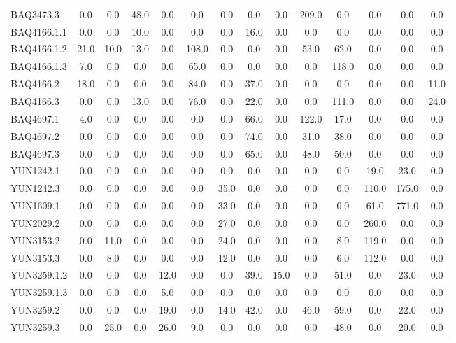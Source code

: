 \documentclass[10pt,a4paper]{article}
\begin{document}
\begin{table}[h]
{\begin{tabular}{|l|*{13}{c|}}
        BAQ3473.3 & 0.0 & 0.0 & 48.0 & 0.0 & 0.0 & 0.0 & 0.0 & 0.0 & 209.0 & 0.0 & 0.0 & 0.0 & 0.0 \\
        BAQ4166.1.1 & 0.0 & 0.0 & 10.0 & 0.0 & 0.0 & 0.0 & 16.0 & 0.0 & 0.0 & 0.0 & 0.0 & 0.0 & 0.0 \\
        BAQ4166.1.2 & 21.0 & 10.0 & 13.0 & 0.0 & 108.0 & 0.0 & 0.0 & 0.0 & 53.0 & 62.0 & 0.0 & 0.0 & 0.0 \\
        BAQ4166.1.3 & 7.0 & 0.0 & 0.0 & 0.0 & 65.0 & 0.0 & 0.0 & 0.0 & 0.0 & 118.0 & 0.0 & 0.0 & 0.0 \\
        BAQ4166.2 & 18.0 & 0.0 & 0.0 & 0.0 & 84.0 & 0.0 & 37.0 & 0.0 & 0.0 & 0.0 & 0.0 & 0.0 & 11.0 \\
        BAQ4166.3 & 0.0 & 0.0 & 13.0 & 0.0 & 76.0 & 0.0 & 22.0 & 0.0 & 0.0 & 111.0 & 0.0 & 0.0 & 24.0 \\
        BAQ4697.1 & 4.0 & 0.0 & 0.0 & 0.0 & 0.0 & 0.0 & 66.0 & 0.0 & 122.0 & 17.0 & 0.0 & 0.0 & 0.0 \\
        BAQ4697.2 & 0.0 & 0.0 & 0.0 & 0.0 & 0.0 & 0.0 & 74.0 & 0.0 & 31.0 & 38.0 & 0.0 & 0.0 & 0.0 \\
        BAQ4697.3 & 0.0 & 0.0 & 0.0 & 0.0 & 0.0 & 0.0 & 65.0 & 0.0 & 48.0 & 50.0 & 0.0 & 0.0 & 0.0 \\
        YUN1242.1 & 0.0 & 0.0 & 0.0 & 0.0 & 0.0 & 0.0 & 0.0 & 0.0 & 0.0 & 0.0 & 19.0 & 23.0 & 0.0 \\
        YUN1242.3 & 0.0 & 0.0 & 0.0 & 0.0 & 0.0 & 35.0 & 0.0 & 0.0 & 0.0 & 0.0 & 110.0 & 175.0 & 0.0 \\
        YUN1609.1 & 0.0 & 0.0 & 0.0 & 0.0 & 0.0 & 33.0 & 0.0 & 0.0 & 0.0 & 0.0 & 61.0 & 771.0 & 0.0 \\
        YUN2029.2 & 0.0 & 0.0 & 0.0 & 0.0 & 0.0 & 27.0 & 0.0 & 0.0 & 0.0 & 0.0 & 260.0 & 0.0 & 0.0 \\
        YUN3153.2 & 0.0 & 11.0 & 0.0 & 0.0 & 0.0 & 24.0 & 0.0 & 0.0 & 0.0 & 8.0 & 119.0 & 0.0 & 0.0 \\
        YUN3153.3 & 0.0 & 8.0 & 0.0 & 0.0 & 0.0 & 12.0 & 0.0 & 0.0 & 0.0 & 6.0 & 112.0 & 0.0 & 0.0 \\
        YUN3259.1.2 & 0.0 & 0.0 & 0.0 & 12.0 & 0.0 & 0.0 & 39.0 & 15.0 & 0.0 & 51.0 & 0.0 & 23.0 & 0.0 \\
        YUN3259.1.3 & 0.0 & 0.0 & 0.0 & 5.0 & 0.0 & 0.0 & 0.0 & 0.0 & 0.0 & 0.0 & 0.0 & 0.0 & 0.0 \\
        YUN3259.2 & 0.0 & 0.0 & 0.0 & 19.0 & 0.0 & 14.0 & 42.0 & 0.0 & 46.0 & 59.0 & 0.0 & 22.0 & 0.0 \\
        YUN3259.3 & 0.0 & 25.0 & 0.0 & 26.0 & 9.0 & 0.0 & 0.0 & 0.0 & 0.0 & 48.0 & 0.0 & 20.0 & 0.0 \\

\end{tabular}}
\end{table}
\end{document}
